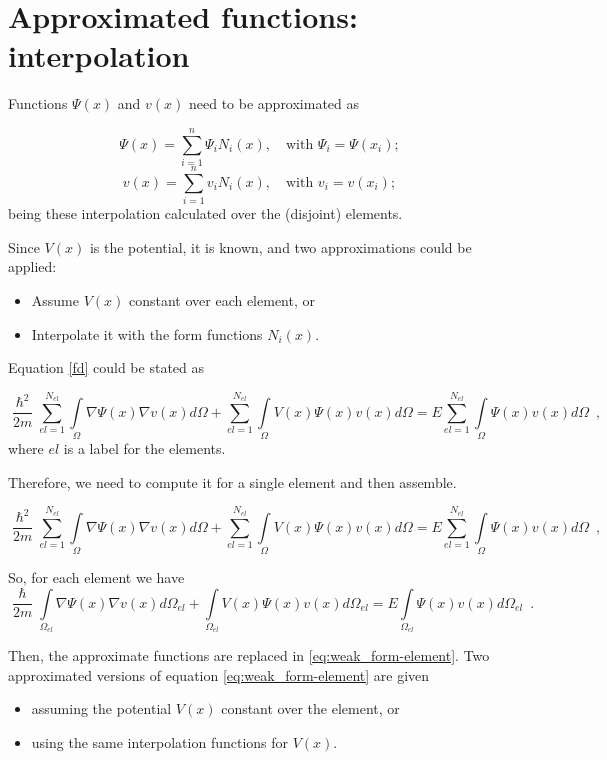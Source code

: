 \documentclass[12pt,letterpaper,final]{article}
\begin{document}
\section{Approximated functions: interpolation}
Functions $\Psi (x)$ and $v(x)$ need to be approximated as

$$\Psi (x) = \sum_{i=1}^{n}\Psi_iN_i(x), \quad \text{with } \Psi_i=\Psi(x_i);$$
$$v (x) = \sum_{i=1}^{n}v_i N_i(x), \quad \text{with } v_i=v(x_i);$$
being these interpolation calculated over the (disjoint) elements.

Since $V(x)$ is the potential, it is known, and two approximations could be applied:

\begin{itemize}
\item Assume $V(x)$ constant over each element, or
\item Interpolate it with the form functions $N_i(x)$.
\end{itemize}

Equation \eqref{fd} could be stated as

\[\frac{\hslash^2}{2m} \sum_{el=1}^{N_{el}} \int\limits_{\Omega}\nabla \Psi(x)\nabla v(x) d\Omega + \sum_{el=1}^{N_{el}} \int\limits_{\Omega}V(x)\Psi(x)v(x)d\Omega  =  E \sum_{el=1}^{N_{el}} \int\limits_{\Omega}\Psi (x)v(x)d\Omega  \enspace ,  \]
where $el$ is a label for the elements.

Therefore, we need to compute it for a single element and then assemble.

\[\frac{\hslash^2}{2m} \sum_{el=1}^{N_{el}} \int\limits_{\Omega}\nabla \Psi(x)\nabla v(x) d\Omega + \sum_{el=1}^{N_{el}} \int\limits_{\Omega}V(x)\Psi(x)v(x)d\Omega  =  E \sum_{el=1}^{N_{el}} \int\limits_{\Omega}\Psi (x)v(x)d\Omega  \enspace ,  \]

So, for each element we have
\begin{equation}
\frac{\hslash}{2m}\int\limits_{\Omega_{el}}\nabla \Psi(x) \nabla v(x) d\Omega_{el} +
\int\limits_{\Omega_{el}} V(x)\Psi(x) v(x) d\Omega_{el} =
E\int\limits_{\Omega_{el}} \Psi(x) v(x)d\Omega_{el} \enspace .
\label{eq:weak_form-element}
\end{equation}

Then, the approximate functions are replaced in \eqref{eq:weak_form-element}. Two approximated
versions of equation \eqref{eq:weak_form-element} are given
\begin{itemize}
\item assuming the potential $V(x)$ constant over the element, or
\item using the same interpolation functions for $V(x)$.
\end{itemize}
\end{document}
